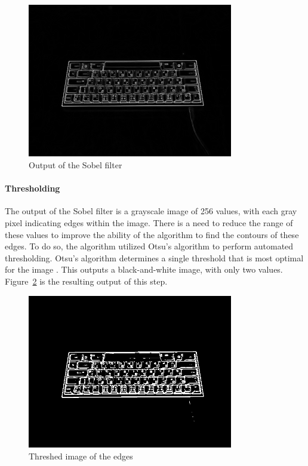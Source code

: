 \documentclass{report}
\begin{document}
\begin{figure}[H]
	\centering
	\includegraphics[width=0.8\textwidth]{sobel.png}
	\caption{Output of the Sobel filter}
	\centering
	\label{fig:metho-algo-sobel}
\end{figure}

\paragraph{Thresholding}
The output of the Sobel filter is a grayscale image of 256 values, with each
gray pixel indicating edges within the image. There is a need to reduce the
range of these values to improve the ability of the algorithm to find the
contours of these edges. To do so, the algorithm utilized Otsu's algorithm to
perform automated thresholding. Otsu's algorithm determines a single threshold
that is most optimal for the image \parencite{otsu}. This outputs a
black-and-white image, with only two values. Figure~\ref{fig:metho-algo-thresh}
is the resulting output of this step.

\begin{figure}[H]
	\centering
	\includegraphics[width=0.8\textwidth]{threshed.png}
	\caption{Threshed image of the edges}
	\label{fig:metho-algo-thresh}
	\centering
\end{figure}
\end{document}
